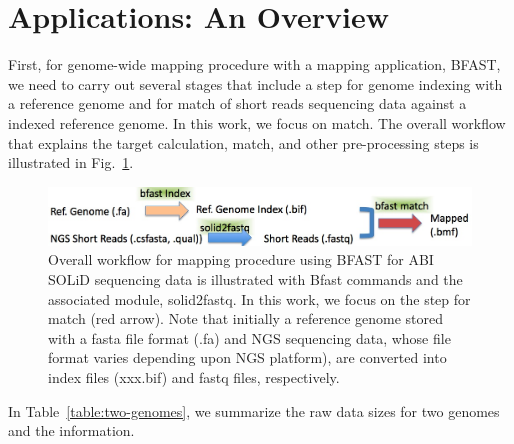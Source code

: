 \documentclass[12pt]{article}
\begin{document}


\section{Applications: An Overview}
First, for genome-wide mapping procedure with a mapping application, BFAST, we need to carry out several stages that include a step for genome indexing with a reference genome and for match of short reads sequencing data against a indexed reference genome.  In this work, we focus on match.   The overall workflow that explains the target calculation, match, and other pre-processing steps is illustrated in Fig.~\ref{fig:workflow-bfast}. 


\begin{figure}
 \centering
\includegraphics[scale=0.35]{bfast-mapping.jpg} 

\caption{\small Overall workflow for mapping procedure using BFAST for ABI SOLiD sequencing data is illustrated with Bfast commands and the associated module, solid2fastq.  In this work, we focus on the step for match (red arrow).  Note that initially a reference genome stored with a fasta file format (.fa) and NGS sequencing data, whose file format varies depending upon NGS platform), are converted into index files (xxx.bif) and fastq files, respectively.  }
  \label{fig:workflow-bfast} \end{figure}


In Table~\ref{table:two-genomes}, we summarize the raw data sizes for
two genomes and the information.  
\end{document}
